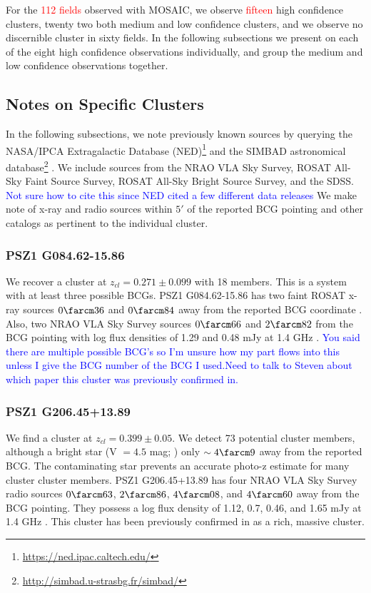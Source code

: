 \documentclass[apj, revtex4-1]{emulateapj}
\newcommand{\editorial}[1]{\textcolor{red}{#1}}
\newcommand{\peditorial}[1]{\textcolor{blue}{#1}}
\begin{document}
For the \editorial{112 fields} observed with MOSAIC, we observe \editorial{fifteen} high confidence clusters, twenty two both medium and low confidence clusters, and we observe no discernible cluster in sixty fields. In the following subsections we present on each of the eight high confidence observations individually, and group the medium and low confidence observations together.

\subsection{Notes on Specific Clusters}

In the following subsections, we note previously known sources by querying the NASA/IPCA Extragalactic Database (NED)\footnote{\url{https://ned.ipac.caltech.edu/}} and the SIMBAD astronomical database\footnote{\url{http://simbad.u-strasbg.fr/simbad/}} \citep{Wenger2000}. We include sources from the NRAO VLA Sky Survey, ROSAT All-Sky Faint Source Survey, ROSAT All-Sky Bright Source Survey, and the SDSS. \peditorial{Not sure how to cite this since NED cited a few different data releases} We make note of x-ray and radio sources within $5'$ of the reported BCG pointing and other catalogs as pertinent to the individual cluster.

\subsubsection{PSZ1 G084.62-15.86}
We recover a cluster at $z_{cl} = 0.271 \pm 0.099$ with 18 members. This is a system with at least three possible BCGs. PSZ1 G084.62-15.86 has two faint ROSAT x-ray sources $0\farcm36$ and $0\farcm84$ away from the reported BCG coordinate \citep{Voges2000}. Also, two NRAO VLA Sky Survey sources $0\farcm66$ and $2\farcm82$ from the BCG pointing with log flux densities of 1.29 and 0.48 mJy at 1.4 GHz \citep{Condon1998}. \peditorial{You said there are multiple possible BCG's so I'm unsure how my part flows into this unless I give the BCG number of the BCG I used.}\peditorial{Need to talk to Steven about which paper this cluster was previously confirmed in.}

\subsubsection{PSZ1 G206.45+13.89}
We find a cluster at $z_{cl} = 0.399 \pm 0.05$. We detect 73 potential cluster members, although a bright star (V $= 4.5$ mag; \citealt{Hog2000}) only $\sim4\farcm9$ away from the reported BCG. The contaminating star prevents an accurate photo-z estimate for many cluster cluster members. PSZ1 G206.45+13.89 has four NRAO VLA Sky Survey radio sources $0\farcm63$, $2\farcm86$, $4\farcm08$, and $4\farcm60$ away from the BCG pointing. They possess a log flux density of 1.12, 0.7, 0.46, and 1.65 mJy at 1.4 GHz \citep{Condon1998}. This cluster has been previously confirmed in \citep{Barrena2018} as a rich, massive cluster. 
\end{document}

